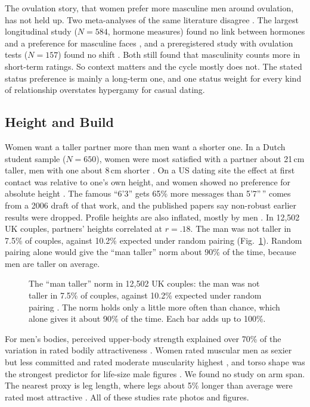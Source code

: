 \documentclass[conference,a4paper]{IEEEtran}
\begin{document}
The ovulation story, that women prefer more masculine men around ovulation, has not held up. Two meta-analyses of the same literature disagree \cite{gildersleeve2014,wood2014}. The largest longitudinal study ($N=584$, hormone measures) found no link between hormones and a preference for masculine faces \cite{jones2018}, and a preregistered study with ovulation tests ($N=157$) found no shift \cite{stern2020}. Both still found that masculinity counts more in short-term ratings. So context matters and the cycle mostly does not. The stated status preference is mainly a long-term one, and one status weight for every kind of relationship overstates hypergamy for casual dating.

\subsection{Height and Build}
Women want a taller partner more than men want a shorter one. In a Dutch student sample ($N=650$), women were most satisfied with a partner about 21\,cm taller, men with one about 8\,cm shorter \cite{stulp2013paid}. On a US dating site the effect at first contact was relative to one's own height, and women showed no preference for absolute height \cite{hitsch2010qme}. The famous ``6'3'' gets 65\% more messages than 5'7''\,'' comes from a 2006 draft of that work, and the published papers say non-robust earlier results were dropped. Profile heights are also inflated, mostly by men \cite{hancock2007}. In 12,502 UK couples, partners' heights correlated at $r=.18$. The man was not taller in 7.5\% of couples, against 10.2\% expected under random pairing \cite{stulp2013plos} (Fig.~\ref{fig:taller}). Random pairing alone would give the ``man taller'' norm about 90\% of the time, because men are taller on average.

\begin{figure}[t]
\centering

\caption{The ``man taller'' norm in 12,502 UK couples: the man was not taller in 7.5\% of couples, against 10.2\% expected under random pairing \cite{stulp2013plos}. The norm holds only a little more often than chance, which alone gives it about 90\% of the time. Each bar adds up to 100\%.}
\label{fig:taller}
\end{figure}

For men's bodies, perceived upper-body strength explained over 70\% of the variation in rated bodily attractiveness \cite{sell2017}. Women rated muscular men as sexier but less committed and rated moderate muscularity highest \cite{frederick2007}, and torso shape was the strongest predictor for life-size male figures \cite{mautz2013}. We found no study on arm span. The nearest proxy is leg length, where legs about 5\% longer than average were rated most attractive \cite{sorokowski2008}. All of these studies rate photos and figures.
\end{document}
